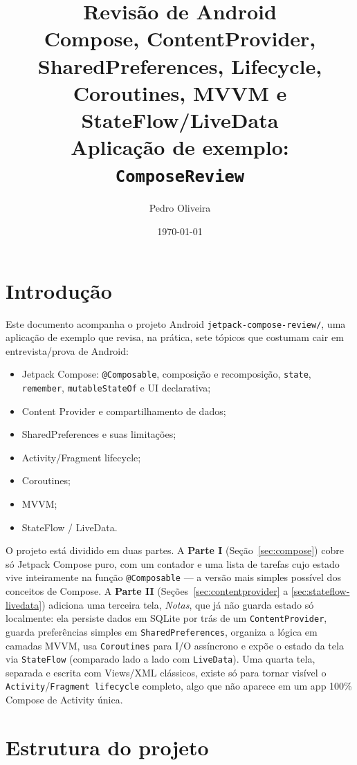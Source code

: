 \documentclass[11pt,a4paper]{article}
\title{\textbf{Revisão de Android} \\ \large Compose, ContentProvider, SharedPreferences, Lifecycle, \\ Coroutines, MVVM e StateFlow/LiveData \\[4pt] \normalsize Aplicação de exemplo: \texttt{ComposeReview}}
\author{Pedro Oliveira}
\date{\today}
\begin{document}

\maketitle
\tableofcontents
\newpage

\section{Introdução}

Este documento acompanha o projeto Android \texttt{jetpack-compose-review/},
uma aplicação de exemplo que revisa, na prática, sete tópicos que costumam
cair em entrevista/prova de Android:

\begin{itemize}
    \item Jetpack Compose: \texttt{@Composable}, composição e
    recomposição, \texttt{state}, \texttt{remember},
    \texttt{mutableStateOf} e UI declarativa;
    \item Content Provider e compartilhamento de dados;
    \item SharedPreferences e suas limitações;
    \item Activity/Fragment lifecycle;
    \item Coroutines;
    \item MVVM;
    \item StateFlow / LiveData.
\end{itemize}

O projeto está dividido em duas partes. A \textbf{Parte I}
(Seção~\ref{sec:compose}) cobre só Jetpack Compose puro, com um contador e
uma lista de tarefas cujo estado vive inteiramente na função
\texttt{@Composable} — a versão mais simples possível dos conceitos de
Compose. A \textbf{Parte II} (Seções~\ref{sec:contentprovider} a
\ref{sec:stateflow-livedata}) adiciona uma terceira tela, \emph{Notas},
que já não guarda estado só localmente: ela persiste dados em SQLite por
trás de um \texttt{ContentProvider}, guarda preferências simples em
\texttt{SharedPreferences}, organiza a lógica em camadas MVVM, usa
\texttt{Coroutines} para I/O assíncrono e expõe o estado da tela via
\texttt{StateFlow} (comparado lado a lado com \texttt{LiveData}). Uma
quarta tela, separada e escrita com Views/XML clássicos, existe só para
tornar visível o \texttt{Activity}/\texttt{Fragment lifecycle}
completo, algo que não aparece em um app 100\% Compose de Activity única.

\section{Estrutura do projeto}
\end{document}
